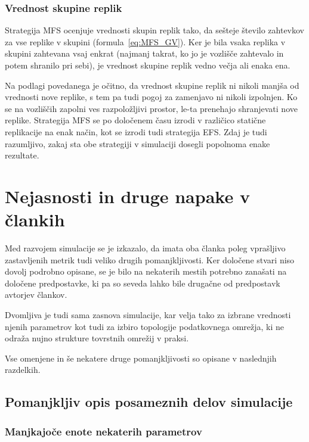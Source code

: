\documentclass[a4paper, 12pt]{book}
\begin{document}
\subsubsection{Vrednost skupine replik}

Strategija MFS ocenjuje vrednosti skupin replik tako, da sešteje število
zahtevkov za vse replike v skupini (formula~\eqref{eq:MFS_GV}). Ker je
bila vsaka replika v skupini zahtevana vsaj enkrat (najmanj takrat, ko jo
je vozlišče zahtevalo in potem shranilo pri sebi), je vrednost skupine replik
vedno večja ali enaka ena.

Na podlagi povedanega je očitno, da vrednost skupine replik ni nikoli manjša
od vrednosti nove replike, s tem pa tudi pogoj za zamenjavo ni nikoli
izpolnjen. Ko se na vozliščih zapolni ves razpoložljivi prostor, le-ta
prenehajo shranjevati nove replike. Strategija MFS se po določenem času
izrodi v različico statične replikacije na enak način, kot se izrodi
tudi strategija EFS. Zdaj je tudi razumljivo, zakaj sta obe strategiji v
simulaciji dosegli popolnoma enake rezultate.


\section{Nejasnosti in druge napake v člankih}

Med razvojem simulacije se je izkazalo, da imata oba članka poleg vprašljivo
zastavljenih metrik tudi veliko drugih pomanjkljivosti. Ker določene stvari
niso dovolj podrobno opisane, se je bilo na nekaterih mestih
potrebno zanašati na določene predpostavke, ki pa so seveda lahko bile
drugačne od predpostavk avtorjev člankov.

Dvomljiva je tudi sama zasnova simulacije, kar velja tako za izbrane
vrednosti njenih parametrov kot tudi za izbiro topologije podatkovnega
omrežja, ki ne odraža nujno strukture tovrstnih omrežij v praksi.

Vse omenjene in še nekatere druge pomanjkljivosti so opisane v naslednjih
razdelkih.

\subsection{Pomanjkljiv opis posameznih delov simulacije}

\subsubsection{Manjkajoče enote nekaterih parametrov}
\end{document}
